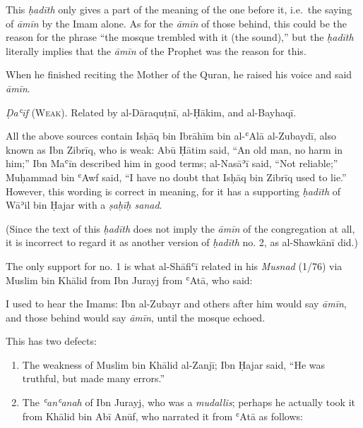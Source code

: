 This \emph{ḥadīth} only gives a part of the meaning of the one before
it, i.e.~the saying of \emph{āmīn} by the Imam alone. As for the
\emph{āmīn} of those behind, this could be the reason for the phrase
``the mosque trembled with it (the sound),'' but the \emph{ḥadīth}
literally implies that the \emph{āmīn} of the Prophet \pbuh was the
reason for this.

\begin{mdframed}[style=narration, frametitle={Narration}]
When he finished reciting the Mother of the Quran, he raised his voice and said \textit{āmīn}.
\end{mdframed}

\emph{Ḍaʿīf} (\textsc{Weak}). Related by al-Dāraquṭnī, al-Ḥākim, and
al-Bayhaqī.

All the above sources contain Isḥāq bin Ibrāhīm bin al-ʿAlā al-Zubaydī,
also known as Ibn Zibrīq, who is weak: Abū Ḥātim said, ``An old man, no
harm in him;'' Ibn Maʿīn described him in good terms; al-Nasāʾī said,
``Not reliable;'' Muḥammad bin ʿAwf said, ``I have no doubt that Isḥāq
bin Zibrīq used to lie.'' However, this wording is correct in meaning,
for it has a supporting \emph{ḥadīth} of Wāʾil bin Ḥajar with a
\emph{ṣaḥīḥ sanad}.

(Since the text of this \emph{ḥadīth} does not imply the \emph{āmīn} of
the congregation at all, it is incorrect to regard it as another version
of \emph{ḥadīth} no. 2, as al-Shawkānī did.)

The only support for no. 1 is what al-Shāfiʿī related in his
\emph{Musnad} (1/76) via Muslim bin Khālid from Ibn Jurayj from ʿAtā,
who said:

\begin{mdframed}[style=narration, frametitle={Narration}]
I used to hear the Imams: Ibn al-Zubayr and others after him would say \textit{āmīn}, and those behind would say \textit{āmīn}, until the mosque echoed.
\end{mdframed}

This has two defects:

\begin{enumerate}
\def\labelenumi{\roman{enumi}.}
\tightlist
\item
  The weakness of Muslim bin Khālid al-Zanjī; Ibn Ḥajar said, ``He was
  truthful, but made many errors.''
\item
  The \emph{ʿanʿanah} of Ibn Jurayj, who was a \emph{mudallis}; perhaps
  he actually took it from Khālid bin Abī Anūf, who narrated it from
  ʿAtā as follows:
\end{enumerate}

